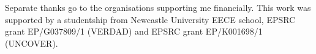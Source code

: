 \documentclass[12pt,english,british]{report}
\begin{document}
Separate thanks go to the organisations supporting me financially. 
This work was supported by a studentship from Newcastle University EECE school, EPSRC grant EP/G037809/1
(\textsc{VERDAD}) and EPSRC grant EP/K001698/1 (\textsc{UNCOVER}).

\newpage
\setcounter{page}{1}






\end{document}
